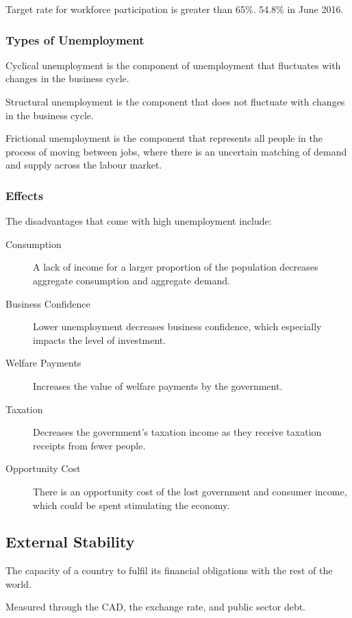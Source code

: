 \documentclass[a4paper,11pt]{report}
\begin{document}
Target rate for workforce participation is greater than 65\%. 54.8\% in June
2016.

\subsubsection{Types of Unemployment}

Cyclical unemployment is the component of unemployment that fluctuates with
changes in the business cycle.

Structural unemployment is the component that does not fluctuate with changes
in the business cycle.

Frictional unemployment is the component that represents all people in the
process of moving between jobs, where there is an uncertain matching of demand
and supply across the labour market.

\subsubsection{Effects}

The disadvantages that come with high unemployment include:

\begin{description}
\item [Consumption] A lack of income for a larger proportion of the population
	decreases aggregate consumption and aggregate demand.
\item [Business Confidence] Lower unemployment decreases business confidence,
	which especially impacts the level of investment.
\item [Welfare Payments] Increases the value of welfare payments by the
	government.
\item [Taxation] Decreases the government's taxation income as they receive
	taxation receipts from fewer people.
\item [Opportunity Cost] There is an opportunity cost of the lost government and
	consumer income, which could be spent stimulating the economy.
\end{description}

\subsection{External Stability}

The capacity of a country to fulfil its financial obligations with the rest of
the world.

Measured through the CAD, the exchange rate, and public sector debt.
\end{document}
